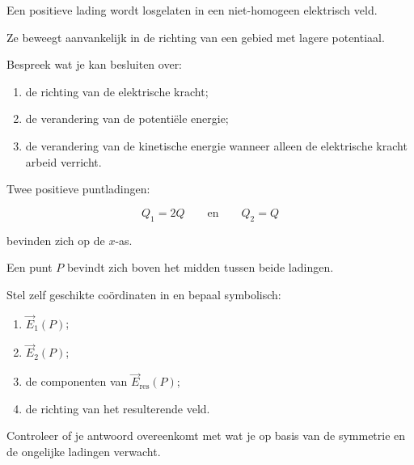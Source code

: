 \documentclass{ximera}
\begin{document}
\begin{oefening}{\oefU\ESS}

Een positieve lading wordt losgelaten in een niet-homogeen elektrisch
veld.

Ze beweegt aanvankelijk in de richting van een gebied met lagere
potentiaal.

Bespreek wat je kan besluiten over:

\begin{enumerate}
  \item de richting van de elektrische kracht;
  \item de verandering van de potentiële energie;
  \item de verandering van de kinetische energie wanneer alleen de
        elektrische kracht arbeid verricht.
\end{enumerate}

\end{oefening}





\begin{oefening}{\oefG}

Twee positieve puntladingen:

\[
Q_1=2Q
\qquad\text{en}\qquad
Q_2=Q
\]

bevinden zich op de $x$-as.

Een punt $P$ bevindt zich boven het midden tussen beide ladingen.

Stel zelf geschikte coördinaten in en bepaal symbolisch:

\begin{enumerate}
  \item $\vec E_1(P)$;
  \item $\vec E_2(P)$;
  \item de componenten van $\vec E_\mathrm{res}(P)$;
  \item de richting van het resulterende veld.
\end{enumerate}

Controleer of je antwoord overeenkomt met wat je op basis van de
symmetrie en de ongelijke ladingen verwacht.

\end{oefening}
\end{document}
